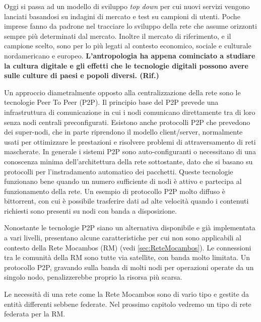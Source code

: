 Oggi si passa ad un modello di sviluppo \emph{top down} per cui nuovi
servizi vengono lanciati basandosi su indagini di mercato e test su
campioni di utenti. Poche imprese fanno da padrone nel tracciare lo
sviluppo della rete che assume orizzonti sempre più determinati dal
mercato. Inoltre il mercato di riferimento, e il campione scelto, sono
per lo più legati al contesto economico, sociale e culturale
nordamericano e europeo. \textbf{L'antropologia ha appena cominciato a
studiare la cultura digitale e gli effetti che le tecnologie digitali
possono avere sulle culture di paesi e popoli diversi. (Rif.)}

Un approccio diametralmente opposto alla centralizzazione della rete
sono le tecnologie Peer To Peer (P2P). Il principio base del P2P
prevede una infrastruttura di comunicazione in cui i nodi comunicano
direttamente tra di loro senza nodi centrali preconfigurati. Esistono
anche protocolli P2P che prevedono dei super-nodi, che in parte
riprendono il modello client/server, normalmente usati per ottimizzare
le prestazioni e risolvere problemi di attraversamento di reti
mascherate. In generale i sistemi P2P sono auto-configuranti o
necessitano di una conoscenza minima dell'architettura della rete
sottostante, dato che si basano su protocolli per l'instradamento
automatico dei pacchetti. Queste tecnologie funzionano bene quando un
numero sufficiente di nodi è attivo e partecipa al funzionamento della
rete. Un esempio di protocollo P2P molto diffuso è bittorrent, con cui
è possibile trasferire dati ad alte velocità quando i contenuti
richiesti sono presenti su nodi con banda a disposizione.

Nonostante le tecnologie P2P siano un alternativa disponibile e già
implementata a vari livelli, presentano alcune caratteristiche per cui
non sono applicabili al contesto della Rete Mocambos (RM) (vedi
\ref{sec:ReteMocambos}). Le connessioni tra le comunità della RM sono
tutte via satellite, con banda molto limitata. Un protocollo P2P,
gravando sulla banda di molti nodi per operazioni operate da un
singolo nodo, penalizzerebbe proprio la risorsa più scarsa.

Le necessità di una rete come la Rete Mocambos sono di vario tipo e gestite da
entità differenti sebbene federate. Nel prossimo capitolo vedremo un
tipo di rete federata per la RM. 

